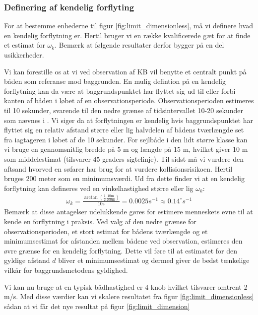 \documentclass[%
 reprint,
nofootinbib,
aps,
]{revtex4-1}
\begin{document}
\subsubsection{Definering af kendelig forflyting}
For at bestemme enhederne til figur \ref{fig:limit_dimensionless}, må vi definere hvad en kendelig forflytning er. Hertil bruger vi en række kvalificerede gæt for at finde et estimat for $\omega_k$. Bemærk at følgende resultater derfor bygger på en del usikkerheder. \par
Vi kan forestille os at vi ved observation af KB vil benytte et centralt punkt på båden som referanse mod baggrunden. En mulig defintion på en kendelig forflytning kan da være at baggrundspunktet har flyttet sig ud til eller forbi kanten af båden i løbet af en observationsperiode. Observationsperioden estimeres til 10 sekunder, svarende til den nedre grænse af tidsintervallet 10-20 sekunder som nævnes i \cite{duelighed}. Vi siger da at forflytningen er kendelig hvis baggrundspunktet har flyttet sig en relativ afstand større eller lig halvdelen af bådens tværlængde set fra iagtageren i løbet af de 10 sekunder. For sejlbåde i den lidt større klasse kan vi bruge en gennomsnitlig bredde på 5 m og længde på 15 m, hvilket giver 10 m som middelestimat (tilsvarer 45 graders sigtelinje). Til sidst må vi vurdere den aftsand hvorved en søfarer har brug for at vurdere kollisionsrisikoen. Hertil bruges 200 meter som en minimumsværdi. Ud fra dette finder vi at en kendelig forflytning kan defineres ved en vinkelhastighed større eller lig $\omega_k$:
\begin{align}
  \omega_k = \frac{\arctan{(\frac{1}{2}\frac{10 \text{m}}{200 \text{m}})}}{10 \text{s}} = 0.0025 s^{-1} \approx  0.14^{\circ}s^{-1}
  \label{eq:omega_k}
\end{align}
Bemærk at disse antagelser udelukkende gøres for estimere menneskets evne til at kende en forflytning i praksis. Ved valg af den nedre grænse for observationsperioden, et stort estimat for bådens tværlængde og et minimumsestimat for afstanden mellem bådene ved observation, estimeres den øvre grænse for en kendelig forflytning. Dette vil føre til at estimatet for den gyldige afstand $d$ bliver et minimumsestimat og dermed giver de bedst tænkelige vilkår for baggrundsmetodens gyldighed. \par
Vi kan nu bruge at en typisk bådhastighed er 4 knob hvilket tilsvarer omtrent 2 m/s. Med disse værdier kan vi skalere resultatet fra figur \ref{fig:limit_dimensionless} sådan at vi får det nye resultat på figur \ref{fig:limit_dimension}
\end{document}
